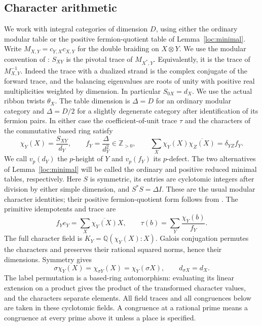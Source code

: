 \documentclass[11pt,a4paper]{article}
\numberwithin{equation}{section}
\begin{document}
\subsection{Character arithmetic}\label{sec:arithmetic}

We work with integral categories of dimension $D$, using either the ordinary
modular table or the positive fermion-quotient table of Lemma~\ref{loc:minimal}.
Write $M_{X,Y}=c_{Y,X}c_{X,Y}$ for the double braiding on $X\otimes Y$.
We use the modular convention of \cite[\S1.3]{DLNCongruence}:
$S_{XY}$ is the pivotal trace of $M_{X^*,Y}$. Equivalently, it is the
trace of $M_{X,Y}^{-1}$. Indeed the trace with a dualized strand is the
complex conjugate of the forward trace, and the balancing eigenvalues
are roots of unity with positive real multiplicities weighted by dimension.
In particular $S_{0X}=d_X$. We use the actual ribbon twists $\theta_X$.
The table dimension is $\Delta=D$ for an ordinary modular category and
$\Delta=D/2$ for a slightly degenerate category after identification
of its fermion pairs. In either case the coefficient-of-unit trace
$\tau$ and the characters of the commutative based ring satisfy
\begin{equation}\label{arith:data}
 \chi_Y(X)=\frac{S_{XY}}{d_Y},\qquad
 f_Y=\frac{\Delta}{d_Y^2}\in\mathbb Z_{>0},\qquad
 \sum_X\chi_Y(X)\overline{\chi_Z(X)}=\delta_{YZ}f_Y.
\end{equation}
We call $v_p(d_Y)$ the $p$-height of $Y$ and $v_p(f_Y)$ its $p$-defect.
The two alternatives of Lemma~\ref{loc:minimal} will be called the
ordinary and positive reduced minimal tables, respectively.
Here $S$ is symmetric, its entries are cyclotomic integers after
division by either simple dimension, and $S^*S=\Delta I$.
These are the usual modular character identities; their positive
fermion-quotient form follows from \cite[Proposition~3.3 and
Corollary~3.4]{YuSlightlyDegenerate}. The primitive idempotents and trace are
\begin{equation}\label{arith:idempotents}
 f_Ye_Y=\sum_X\overline{\chi_Y(X)}X,
 \qquad \tau(b)=\sum_Y\frac{\chi_Y(b)}{f_Y}.
\end{equation}
The full character field is $K_Y=\mathbb Q(\chi_Y(X):X)$.
Galois conjugation permutes the characters and preserves their
rational squared norms, hence their dimensions. Symmetry gives
\begin{equation}\label{arith:galois}
 \sigma\chi_Y(X)=\chi_{\sigma Y}(X)
                 =\chi_Y(\sigma X),\qquad d_{\sigma X}=d_X.
\end{equation}
The label permutation is a based-ring automorphism: evaluating its
linear extension on a product gives the product of the transformed
character values, and the characters separate elements.
All field traces and all congruences below are taken in these
cyclotomic fields. A congruence at a rational prime means a
congruence at every prime above it unless a place is specified.
\end{document}
